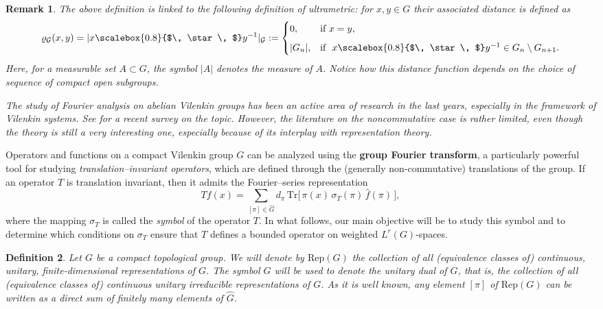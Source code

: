 \documentclass[12pt, reqno]{amsart}
\newtheorem{defi}{Definition}[section]
\newtheorem{rem}[defi]{Remark}
\newcommand{\1}{\mathds{1}}
\newcommand{\smallstar}{\scalebox{0.8}{$\, \star \, $}}
\begin{document}
\begin{rem}\label{remdefimetric}
The above definition is linked to the following definition of ultrametric: for $x, y \in G$ their associated distance is defined as
\[
\varrho_{\mathcal{G}}(x,y) = |x \smallstar y^{-1}|_{\mathcal{G}} :=
\begin{cases}
0, & \text{if } x = y,\\[2mm]
|G_n|, & \text{if } \, \,   x \smallstar y^{-1} \in G_n \setminus G_{n+1}.
\end{cases}
\]
Here, for a measurable set $A \subset G$, the symbol $|A|$ denotes the measure of $A$. Notice how this distance function depends on the choice of sequence of compact open subgroups.

The study of Fourier analysis on abelian Vilenkin groups has been an active area of research in the last years, especially in the framework of Vilenkin systems. See \cite{Persson2022} for a recent survey on the topic. However, the literature on the noncommutative case is rather limited, even though the theory is still a very interesting one, especially because of its interplay with representation theory.
\end{rem}
Operators and functions on a compact Vilenkin group \(G\) can be analyzed using the \textbf{group Fourier transform}, a particularly powerful tool for studying \emph{translation--invariant operators}, which are defined through the (generally non-commutative) translations of the group. If an operator \(T\) is translation invariant, then it admits the Fourier--series representation
\[
Tf(x)= \sum_{[\pi] \in \widehat{G}} d_{\pi}\,\mathrm{Tr}\big[\,\pi(x)\,\sigma_T(\pi)\,\widehat{f}(\pi)\,\big],
\]
where the mapping \(\sigma_T\) is called the \emph{symbol} of the operator \(T\). 
In what follows, our main objective will be to study this symbol and to determine which conditions on \(\sigma_T\) ensure that \(T\) defines a bounded operator on weighted \(L^{r}(G)\)-spaces.
   

\begin{defi}
Let $G$ be a compact topological group. We will denote by $\mathrm{Rep}(G)$ the collection of all (equivalence classes of) continuous, unitary, finite-dimensional representations of $G$. The symbol $\widehat{G}$ will be used to denote the unitary dual of $G$, that is, the collection of all (equivalence classes of) continuous unitary irreducible representations of $G$. As it is well known, any element $[\pi]$ of $\mathrm{Rep}(G)$ can be written as a direct sum of finitely many elements of $\widehat{G}$.
\end{defi}
\end{document}
